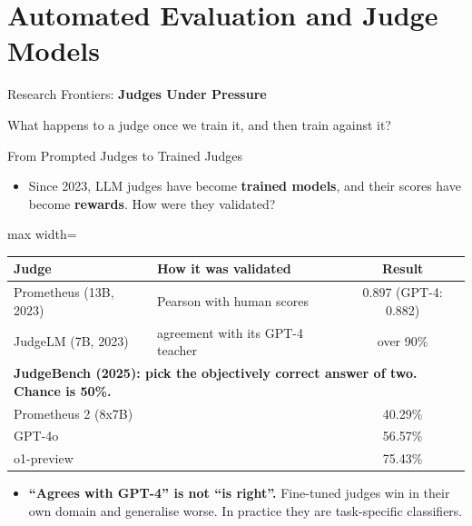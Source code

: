 \section{Automated Evaluation and Judge Models}

\begin{frame}{}
    \LARGE Research Frontiers: \textbf{Judges Under Pressure}

    \vspace{1em}
    \normalsize What happens to a judge once we train it, and then train against it?
\end{frame}

\begin{frame}{From Prompted Judges to Trained Judges}
    \begin{itemize}\itemsep0.35em
        \item Since 2023, LLM judges have become \textbf{trained models}, and their scores have become \textbf{rewards}. How were they validated?
    \end{itemize}
    \begin{center}
    \small
    \renewcommand{\arraystretch}{1.12}
    \begin{adjustbox}{max width=\linewidth}\begin{tabular}{llc}
        \toprule
        \textbf{Judge} & \textbf{How it was validated} & \textbf{Result} \\
        \midrule
        Prometheus (13B, 2023) & Pearson with human scores & 0.897 (GPT-4: 0.882) \\
        JudgeLM (7B, 2023) & agreement with its GPT-4 teacher & over 90\% \\
        \midrule
        \multicolumn{3}{l}{\textbf{JudgeBench (2025): pick the objectively correct answer of two. Chance is 50\%.}} \\
        \midrule
        Prometheus 2 (8x7B) & & \alert{40.29\%} \\
        GPT-4o & & 56.57\% \\
        \rowcolor{KAUSTcyan!12} o1-preview & & 75.43\% \\
        \bottomrule
    \end{tabular}\end{adjustbox}
    \end{center}
    \begin{itemize}\itemsep0.35em
        \item \textbf{``Agrees with GPT-4'' is not ``is right''.} Fine-tuned judges win in their own domain and generalise worse. In practice they are task-specific classifiers.
    \end{itemize}
\end{frame}

